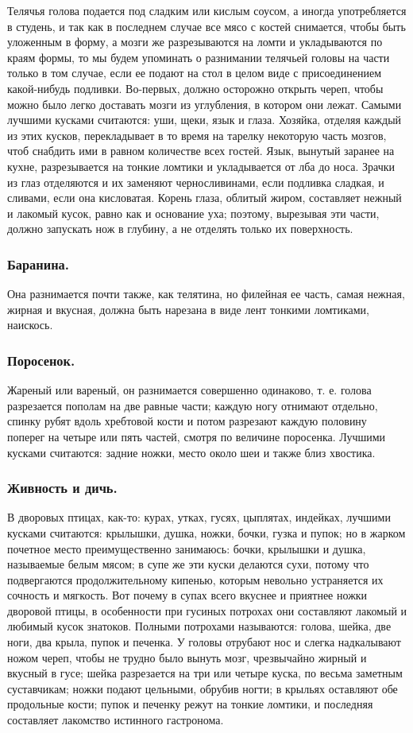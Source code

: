Телячья голова подается под сладким или кислым соусом, а иногда употребляется в студень, и так как в последнем случае все мясо с костей снимается, чтобы быть уложенным в форму, а мозги же разрезываются на ломти и укладываются по краям формы, то мы будем упоминать о разнимании телячьей головы на части только в том случае, если ее подают на стол в целом виде с присоединением какой-нибудь подливки. Во-первых, должно осторожно открыть череп, чтобы можно было легко доставать мозги из углубления, в котором они лежат. Самыми лучшими кусками считаются: уши, щеки, язык и глаза. Хозяйка, отделяя каждый из этих кусков, перекладывает в то время на тарелку некоторую часть мозгов, чтоб снабдить ими в равном количестве всех гостей. Язык, вынутый заранее на кухне, разрезывается на тонкие ломтики и укладывается от лба до носа. Зрачки из глаз отделяются и их заменяют черносливинами, если подливка сладкая, и сливами, если она кисловатая. Корень глаза, облитый жиром, составляет нежный и лакомый кусок, равно как и основание уха; поэтому, вырезывая эти части, должно запускать нож в глубину, а не отделять только их поверхность.

\subsubsection{Баранина.}
Она разнимается почти также, как телятина, но филейная ее часть, самая нежная, жирная и вкусная, должна быть нарезана в виде лент тонкими ломтиками, наискось.

\subsubsection{Поросенок.}
Жареный или вареный, он разнимается совершенно одинаково, т. е. голова разрезается пополам на две равные части; каждую ногу отнимают отдельно, спинку рубят вдоль хребтовой кости и потом разрезают каждую половину поперег на четыре или пять частей, смотря по величине поросенка. Лучшими кусками считаются: задние ножки, место около шеи и также близ хвостика.

\subsubsection{Живность и дичь.}
В дворовых птицах, как-то: курах, утках, гусях, цыплятах, индейках, лучшими кусками считаются: крылышки, душка, ножки, бочки, гузка и пупок; но в жарком почетное место преимущественно занимаюсь: бочки, крылышки и душка, называемые белым мясом; в супе же эти куски делаются сухи, потому что подвергаются продолжительному кипенью, которым невольно устраняется их сочность и мягкость. Вот почему в супах всего вкуснее и приятнее ножки дворовой птицы, в особенности при гусиных потрохах они составляют лакомый и любимый кусок знатоков. Полными потрохами называются: голова, шейка, две ноги, два крыла, пупок и печенка. У головы отрубают нос и слегка надкалывают ножом череп, чтобы не трудно было вынуть мозг, чрезвычайно жирный и вкусный в гусе; шейка разрезается на три или четыре куска, по весьма заметным суставчикам; ножки подают цельными, обрубив ногти; в крыльях оставляют обе продольные кости; пупок и печенку режут на тонкие ломтики, и последняя составляет лакомство истинного гастронома.

